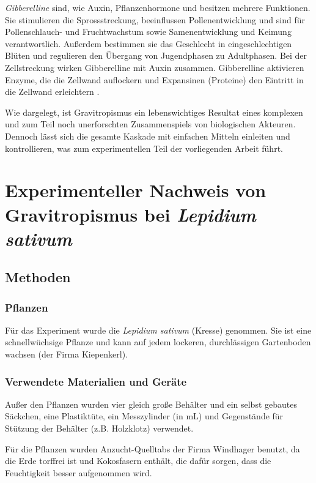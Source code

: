 \documentclass[
a4paper, 
11pt, 
ngerman,
listof=totoc,
bibliography=totocnumbered,
abstracton
]{scrreprt}
\begin{document}
\emph{Gibberelline} sind, wie Auxin, Pflanzenhormone und besitzen mehrere Funktionen. 
Sie stimulieren die Sprossstreckung, beeinflussen Pollenentwicklung und sind für Pollenschlauch- und Fruchtwachstum sowie Samenentwicklung und Keimung verantwortlich. Außerdem bestimmen sie das Geschlecht in eingeschlechtigen Blüten und regulieren den Übergang von Jugendphasen zu Adultphasen. 
Bei der Zellstreckung wirken Gibberelline mit Auxin zusammen. Gibberelline aktivieren Enzyme, die die Zellwand auflockern und Expansinen (Proteine) den Eintritt in die Zellwand erleichtern \parencite[1122f]{campbell}.

 
Wie dargelegt, ist Gravitropismus ein lebenswichtiges Resultat eines komplexen und zum Teil noch unerforschten Zusammenspiels von biologischen Akteuren. Dennoch lässt sich die gesamte Kaskade mit einfachen Mitteln einleiten und kontrollieren, was zum experimentellen Teil der vorliegenden Arbeit führt. 



\chapter{Experimenteller Nachweis von Gravitropismus bei \emph{Lepidium sativum}}

\section{Methoden}

\subsection{Pflanzen}

Für das Experiment wurde die \emph{Lepidium sativum} (Kresse) genommen. Sie ist eine schnellwüchsige Pflanze und kann auf jedem lockeren, durchlässigen Gartenboden wachsen (der Firma Kiepenkerl).


\subsection{Verwendete Materialien und Geräte}

Außer den Pflanzen wurden vier gleich große Behälter und ein selbst gebautes Säckchen, eine Plastiktüte, ein Messzylinder (in mL) und Gegenstände für Stützung der Behälter (z.B. Holzklotz) verwendet.

Für die Pflanzen wurden Anzucht-Quelltabs der Firma Windhager benutzt, da die Erde torffrei ist und Kokosfasern enthält, die dafür sorgen, dass die Feuchtigkeit besser aufgenommen wird.
\end{document}
